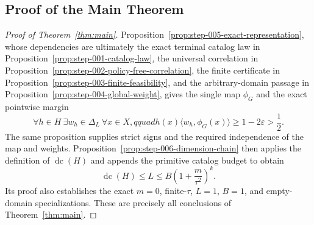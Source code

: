 \subsection{Proof of the Main Theorem}

\begin{proof}[Proof of Theorem~\ref{thm:main}]
Proposition~\ref{prop:step-005-exact-representation}, whose dependencies are
ultimately the exact terminal catalog law in
Proposition~\ref{prop:step-001-catalog-law}, the universal correlation in
Proposition~\ref{prop:step-002-policy-free-correlation}, the finite
certificate in Proposition~\ref{prop:step-003-finite-feasibility}, and the
arbitrary-domain passage in Proposition~\ref{prop:step-004-global-weight},
gives the single map $\phi_G$ and the exact pointwise margin
\[
\forall h\in H\ \exists w_h\in\Delta_L\ \forall x\in X,qquad
h(x)\langle w_h,\phi_G(x)\rangle
\ge1-2\varepsilon>\frac12.
\]
The same proposition supplies strict signs and the required independence of
the map and weights.  Proposition~\ref{prop:step-006-dimension-chain} then
applies the definition of $\operatorname{dc}(H)$ and appends the primitive
catalog budget to obtain
\[
\operatorname{dc}(H)\le L
\le B\left(1+\frac{m}{\tau^2}\right)^k.
\]
Its proof also establishes the exact $m=0$, finite-$\tau$, $L=1$, $B=1$,
and empty-domain specializations.  These are precisely all conclusions of
Theorem~\ref{thm:main}.
\end{proof}

